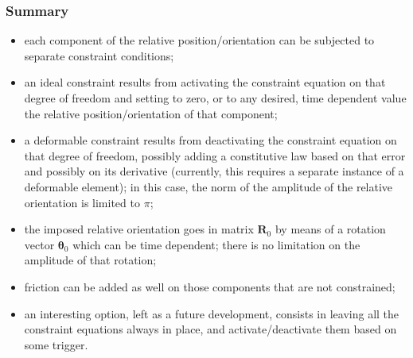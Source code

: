 \documentclass[10pt,fleqn,subeqn]{report}
\newcommand{\T}[1]{\bm{#1}}
\begin{document}
\subsubsection{Summary}
\begin{itemize}
\item each component of the relative position/orientation can be subjected
to separate constraint conditions;
\item an ideal constraint results from activating the constraint equation
on that degree of freedom and setting to zero, or to any desired,
time dependent value the relative position/orientation of that component;
\item a deformable constraint results from deactivating the constraint
equation on that degree of freedom, possibly adding a constitutive law
based on that error and possibly on its derivative (currently, this requires
a separate instance of a deformable element);
in this case, the norm of the amplitude of the relative orientation 
is limited to $\pi$;
\item the imposed relative orientation goes in matrix $\T{R}_0$
by means of a rotation vector $\T{\theta}_0$ which can be time dependent;
there is no limitation on the amplitude of that rotation;
\item friction can be added as well on those components
that are not constrained;
\item an interesting option, left as a future development, consists
in leaving all the constraint equations always in place,
and activate/deactivate them based on some trigger.
\end{itemize}
 
\end{document}
